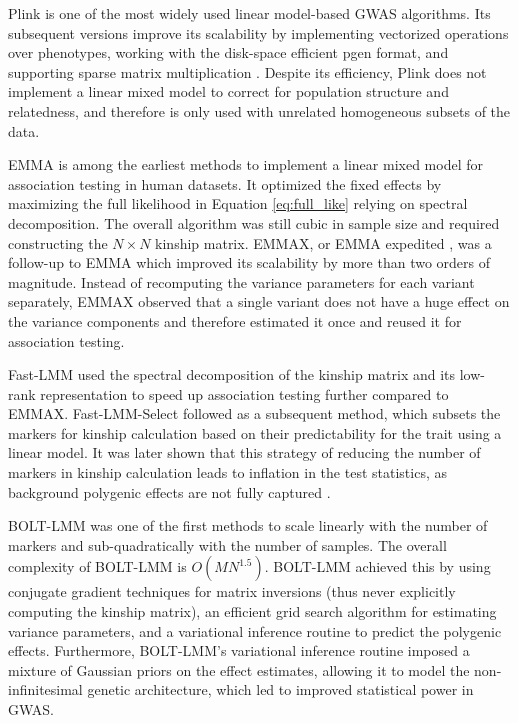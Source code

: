 Plink \cite{purcell2007plink} is one of the most widely used linear model-based GWAS algorithms. Its subsequent versions \cite{chang2015second} improve its scalability by implementing vectorized operations over phenotypes, working with the disk-space efficient pgen format, and supporting sparse matrix multiplication \cite{rivas2024efficient}. Despite its efficiency, Plink does not implement a linear mixed model to correct for population structure and relatedness, and therefore is only used with unrelated homogeneous subsets of the data.

EMMA \cite{kang2008efficient} is among the earliest methods to implement a linear mixed model for association testing in human datasets. It optimized the fixed effects by maximizing the full likelihood in Equation \ref{eq:full_like} relying on spectral decomposition. The overall algorithm was still cubic in sample size and required constructing the \(N \times N\) kinship matrix. EMMAX, or EMMA expedited \cite{kang2010variance}, was a follow-up to EMMA which improved its scalability by more than two orders of magnitude. Instead of recomputing the variance parameters for each variant separately, EMMAX observed that a single variant does not have a huge effect on the variance components and therefore estimated it once and reused it for association testing.

Fast-LMM \cite{lippert2011fast} used the spectral decomposition of the kinship matrix and its low-rank representation to speed up association testing further compared to EMMAX. Fast-LMM-Select \cite{listgarten2013fast} followed as a subsequent method, which subsets the markers for kinship calculation based on their predictability for the trait using a linear model. It was later shown that this strategy of reducing the number of markers in kinship calculation leads to inflation in the test statistics, as background polygenic effects are not fully captured \cite{yang2014advantages}.

BOLT-LMM \cite{loh2015efficient,loh2018mixed} was one of the first methods to scale linearly with the number of markers and sub-quadratically with the number of samples. The overall complexity of BOLT-LMM is \(O(MN^{1.5})\). BOLT-LMM achieved this by using conjugate gradient techniques for matrix inversions (thus never explicitly computing the kinship matrix), an efficient grid search algorithm for estimating variance parameters, and a variational inference routine to predict the polygenic effects. Furthermore, BOLT-LMM's variational inference routine imposed a mixture of Gaussian priors on the effect estimates, allowing it to model the non-infinitesimal genetic architecture, which led to improved statistical power in GWAS.

